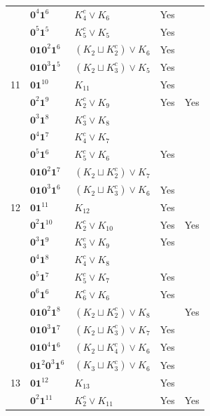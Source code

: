 \documentclass[preprint]{elsarticle}
\begin{document}
\begin{center}
\begin{longtable}{p{0.7cm} p{2cm} p{4cm} p{1cm} p{0cm}}
&$\mathbf{0}^4 \mathbf{1}^6$ & $ K_{4}^c \vee K_{6}$ & Yes&\\
&$\mathbf{0}^5 \mathbf{1}^5$ & $ K_{5}^c \vee K_{5}$ & Yes&\\
&$\mathbf{0}\mathbf{1} \mathbf{0}^2 \mathbf{1}^6$ & $ (K_{2} \sqcup K_{2}^c) \vee K_{6}$ & Yes&\\
&$\mathbf{0}\mathbf{1}\mathbf{0}^3 \mathbf{1}^5$ & $ (K_{2} \sqcup K_{3}^c )\vee K_{5}$ & Yes&\\
\hline
11&$\mathbf{0}\mathbf{1}^{10}$ & $ K_{11}$ & Yes&\\
&$\mathbf{0}^2 \mathbf{1}^9$ & $ K_{2}^c \vee K_{9}$ & Yes&Yes\\
&$\mathbf{0}^3 \mathbf{1}^8$ & $ K_{3}^c \vee K_{8}$ & &\\
&$\mathbf{0}^4 \mathbf{1}^7$ & $ K_{4}^c \vee K_{7}$ & &\\
&$\mathbf{0}^5 \mathbf{1}^6$ & $ K_{5}^c \vee K_{6}$ & Yes&\\
&$\mathbf{0}\mathbf{1}\mathbf{0}^2 \mathbf{1}^7$ & $ (K_{2} \sqcup K_{2}^c )\vee K_{7}$ & &\\
&$\mathbf{0}\mathbf{1}\mathbf{0}^3 \mathbf{1}^6$ & $( K_{2} \sqcup K_{3}^c )\vee K_{6}$ & Yes &\\
\hline
12&$\mathbf{0}\mathbf{1}^{11}$ & $ K_{12}$ & Yes&\\
&$\mathbf{0}^2 \mathbf{1}^{10}$ & $ K_{2}^c \vee K_{10}$ & Yes & Yes \\
&$\mathbf{0}^3 \mathbf{1}^{9}$ & $ K_{3}^c \vee K_{9}$ & Yes &\\
&$\mathbf{0}^4 \mathbf{1}^8$ & $ K_{4}^c \vee K_{8}$ & &\\
&$\mathbf{0}^5 \mathbf{1}^{7}$ & $ K_{5}^c \vee K_{7}$ & Yes&\\
&$\mathbf{0}^6 \mathbf{1}^{6}$ & $ K_{6}^c \vee K_{6}$ & Yes&\\
&$\mathbf{0}\mathbf{1}\mathbf{0}^2 \mathbf{1}^8$ & $ (K_{2} \sqcup K_{2}^c )\vee K_{8}$ & & Yes\\
&$\mathbf{0}\mathbf{1}\mathbf{0}^3 \mathbf{1}^7$ & $ (K_{2} \sqcup K_{3}^c )\vee K_{7}$ & Yes&\\
&$\mathbf{0}\mathbf{1}\mathbf{0}^4 \mathbf{1}^6$ & $ (K_{2} \sqcup K_{4}^c )\vee K_{6}$ & Yes&\\
&$\mathbf{0}\mathbf{1}^2 \mathbf{0}^3 \mathbf{1}^6$ & $ (K_{3} \sqcup K_{3}^c )\vee K_{6}$ & Yes&\\
\hline
13&$\mathbf{0}\mathbf{1}^{12}$ & $ K_{13}$ & Yes&\\
&$\mathbf{0}^2 \mathbf{1}^{11}$ & $ K_{2}^c \vee K_{11}$ & Yes&Yes\\

\end{longtable}
\end{center}
\end{document}
